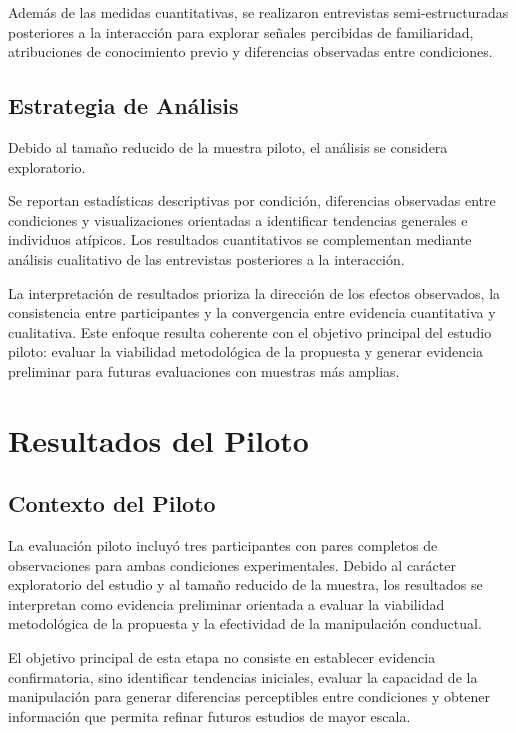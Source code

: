 \documentclass[sigconf, nonacm, language=spanish]{acmart}
\begin{document}
Además de las medidas cuantitativas, se realizaron entrevistas semi-estructuradas posteriores a la interacción para explorar señales percibidas de familiaridad, atribuciones de conocimiento previo y diferencias observadas entre condiciones.

\subsection{Estrategia de Análisis}

Debido al tamaño reducido de la muestra piloto, el análisis se considera exploratorio.

Se reportan estadísticas descriptivas por condición, diferencias observadas entre condiciones y visualizaciones orientadas a identificar tendencias generales e individuos atípicos. Los resultados cuantitativos se complementan mediante análisis cualitativo de las entrevistas posteriores a la interacción.

La interpretación de resultados prioriza la dirección de los efectos observados, la consistencia entre participantes y la convergencia entre evidencia cuantitativa y cualitativa. Este enfoque resulta coherente con el objetivo principal del estudio piloto: evaluar la viabilidad metodológica de la propuesta y generar evidencia preliminar para futuras evaluaciones con muestras más amplias.

\section{Resultados del Piloto}

\subsection{Contexto del Piloto}

La evaluación piloto incluyó tres participantes con pares completos de observaciones para ambas condiciones experimentales. Debido al carácter exploratorio del estudio y al tamaño reducido de la muestra, los resultados se interpretan como evidencia preliminar orientada a evaluar la viabilidad metodológica de la propuesta y la efectividad de la manipulación conductual.

El objetivo principal de esta etapa no consiste en establecer evidencia confirmatoria, sino identificar tendencias iniciales, evaluar la capacidad de la manipulación para generar diferencias perceptibles entre condiciones y obtener información que permita refinar futuros estudios de mayor escala.
\end{document}
